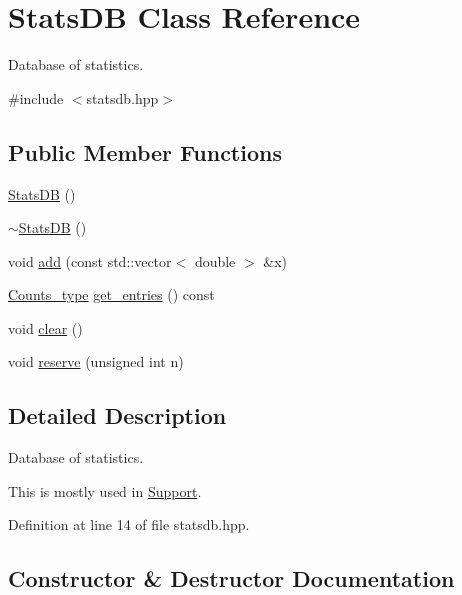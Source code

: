 \hypertarget{class_stats_d_b}{}\section{Stats\+DB Class Reference}
\label{class_stats_d_b}


Database of statistics.  




{\ttfamily \#include $<$statsdb.\+hpp$>$}

\subsection*{Public Member Functions}
\begin{DoxyCompactItemize}
\item 
\hyperlink{class_stats_d_b_a454159e71dfe6af418dfdd8704c38c8c}{Stats\+DB} ()
\item 
\hyperlink{class_stats_d_b_ab4a9371d706b7418df5cb44e81fb5429}{$\sim$\+Stats\+DB} ()
\item 
void \hyperlink{class_stats_d_b_a5759e17b759fcafeec7601188aaa8266}{add} (const std\+::vector$<$ double $>$ \&x)
\item 
\hyperlink{typedefs_8hpp_aee40fa17c1fddb63dd1f2b1470ade95b}{Counts\+\_\+type} \hyperlink{class_stats_d_b_a8ed62f6a3939b90b3493de944c9b67fc}{get\+\_\+entries} () const
\item 
void \hyperlink{class_stats_d_b_a5de68def55b0a3b99a8f609815624a00}{clear} ()
\item 
void \hyperlink{class_stats_d_b_a3370b7f2fb16aa047f8a938232a98602}{reserve} (unsigned int n)
\end{DoxyCompactItemize}


\subsection{Detailed Description}
Database of statistics. 

This is mostly used in {\ttfamily \hyperlink{class_support}{Support}}. 

Definition at line 14 of file statsdb.\+hpp.



\subsection{Constructor \& Destructor Documentation}
\mbox{\label{class_stats_d_b_a454159e71dfe6af418dfdd8704c38c8c}} 
